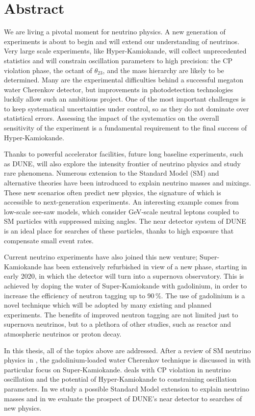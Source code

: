 \clearpage

\section*{Abstract}

We are living a pivotal moment for neutrino physics.
A new generation of experiments is about to begin and will extend our understanding of neutrinos. %
Very large scale experiments, like Hyper-Kamiokande, will collect unprecedented statistics and %
will constrain oscillation parameters to high precision: the CP violation phase, the octant of $\theta_{23}$, %
and the mass hierarchy are likely to be determined.
Many are the experimental difficulties behind a successful megaton water Cherenkov detector, %
but improvements in photodetection technologies luckily allow such an ambitious project.
One of the most important challenges is to keep systematical uncertainties under control, %
so as they do not dominate over statistical errors.
Assessing the impact of the systematics on the overall sensitivity of the experiment is a fundamental requirement %
to the final success of Hyper-Kamiokande.

Thanks to powerful accelerator facilities, future long baseline experiments, such as DUNE, will also explore %
the intensity frontier of neutrino physics and study rare phenomena.
Numerous extension to the Standard Model (SM) and alternative theories have been introduced to %
explain neutrino masses and mixings.
These new scenarios often predict new physics, the signature of which is accessible to next-generation experiments.
An interesting example comes from low-scale see-saw models, which consider GeV-scale neutral leptons %
coupled to SM particles with suppressed mixing angles.
The near detector system of DUNE is an ideal place for searches of these particles, %
thanks to high exposure that compensate small event rates.

Current neutrino experiments have also joined this new venture; %
Super-Kamiokande has been extensively refurbished in view of a new phase, starting in early 2020, %
in which the detector will turn into a supernova observatory.
This is achieved by doping the water of Super-Kamiokande with gadolinium, %
in order to increase the efficiency of neutron tagging up to 90\,\%.
The use of gadolinium is a novel technique which will be adopted by many existing and planned experiments.
The benefits of improved neutron tagging are not limited just to supernova neutrinos, but %
to a plethora of other studies, such as reactor and atmospheric neutrinos or proton decay.

In this thesis, all of the topics above are addressed.
After a review of SM neutrino physics in , the gadolinium-loaded water Cherenkov technique %
is discussed in  with particular focus on Super-Kamiokande.
 deals with CP violation in neutrino oscillation and the potential of Hyper-Kamiokande to %
constraining oscillation parameters.
In  we study a possible Standard Model extension to explain neutrino masses %
and in  we evaluate the prospect of DUNE's near detector to searches of new physics.

